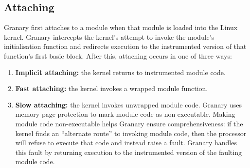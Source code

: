 \documentclass[preprint]{sigplanconf}
\newcommand{\comment}[1]{}
\begin{document}









\subsection{Attaching}
Granary first attaches to a module when that module is loaded into the Linux kernel. Granary intercepts the kernel's attempt to invoke the module's initialisation function and redirects execution to the instrumented version of that function's first basic block. After this, attaching occurs in one of three ways: \begin{enumerate}
	\item {\bf Implicit attaching:} the kernel returns to instrumented module code.
	\item {\bf Fast attaching:} the kernel invokes a wrapped module function.
	\item {\bf Slow attaching:} the kernel invokes unwrapped module code. Granary uses memory page protection to mark module code as non-executable. Making module code non-executable helps Granary ensure comprehensiveness: if the kernel finds an ``alternate route'' to invoking module code, then the processor will refuse to execute that code and instead raise a fault. Granary handles this fault by returning execution to the instrumented version of the faulting module code.
\end{enumerate}
\end{document}
